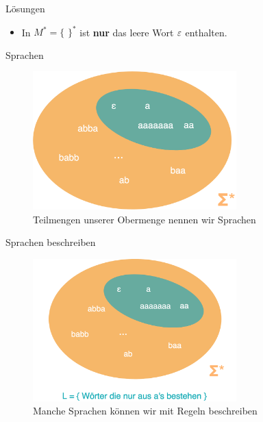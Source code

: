 {
\begin{frame}{Lösungen}
  \begin{itemize}
        \item In $M^{*} = \{$ $ \}^{*}$ ist \textbf{nur} das leere Wort $\varepsilon$ enthalten.
    \end{itemize}
\end{frame}
}

\begin{frame}[fragile]{Sprachen}
\begin{figure}
    \centering
    \includegraphics[width=0.7\textwidth]{../figures/MysterySprache.png}
    \caption{Teilmengen unserer Obermenge nennen wir Sprachen}
    \label{fig:my_label}
\end{figure}
\end{frame}

\begin{frame}[fragile]{Sprachen beschreiben}
\begin{figure}
    \centering
    \includegraphics[width=0.7\textwidth]{../figures/SprachReveal.png}
    \caption{Manche Sprachen können wir mit Regeln beschreiben}
    \label{fig:my_label}
\end{figure}
\end{frame}

